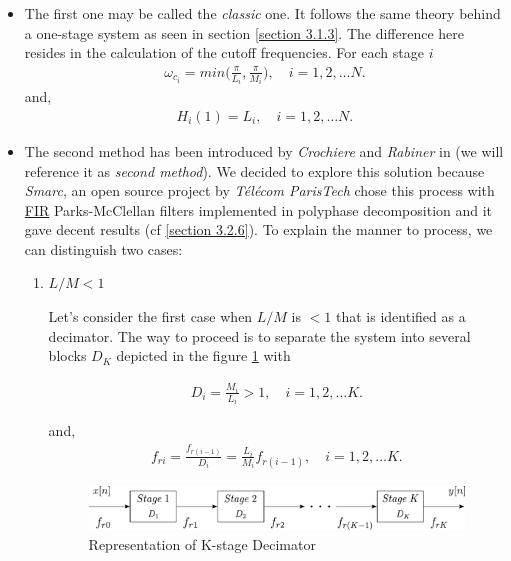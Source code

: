 \begin{itemize}
	\item The first one may be called the \textit{classic} one. It follows the same theory behind a one-stage system as seen in section \ref{section 3.1.3}. The difference here resides in the calculation of the cutoff frequencies. For each stage $i$
	\begin{align}
		\omega_{c_i} = min\Big(\frac{\pi}{L_i},\frac{\pi}{M_i}\Big), \quad i = 1,2,\dots N. \label{eqn:3.26}
	\end{align}
	and,
	\begin{align}
		H_i(1) = L_i, \quad i = 1,2,\dots N. \label{eqn:3.27}
	\end{align}
	 	
	 \item The second method has been introduced by \textit{Crochiere} and \textit{Rabiner} in \cite{crochiere} (we will reference it as \textit{second method}). We decided to explore this solution because \textit{Smarc}, an open source project by \textit{Télécom ParisTech} \cite{paristech} chose this process with \hyperlink{FIR}{FIR} Parks-McClellan filters implemented in polyphase decomposition and it gave decent results (cf \ref{section 3.2.6}). To explain the manner to process, we can distinguish two cases:
	 
	 \begin{enumerate}
	 	\item $L/M < 1$
	 	
	 	Let's consider the first case when $L/M$ is $<1$ that is identified as a decimator. The way to proceed is to separate the system into several blocks $D_K$ depicted in the figure \ref{Figure 3.13} with 
	 	
	 	\begin{align}
	 		D_i = \frac{M_i}{L_i} > 1, \quad i = 1,2,\dots K.\label{eqn:3.28}
	 	\end{align} 
	 	
	 	and,
	 	\begin{align}
	 		f_{ri} = \frac{f_{r(i-1)}}{D_i} = \frac{L_i}{M_i}f_{r(i-1)}, \quad i = 1,2,\dots K.
	 	\end{align}
	 	
	 	\begin{figure}[ht!]
	 		\centering
	 		\hspace*{10mm}
	 		\includegraphics[scale = 0.68]{multistage_sup1_1.pdf}
	 		\caption{Representation of K-stage Decimator}\label{Figure 3.13}
	 	\end{figure}
 	

\end{enumerate}
\end{itemize}
